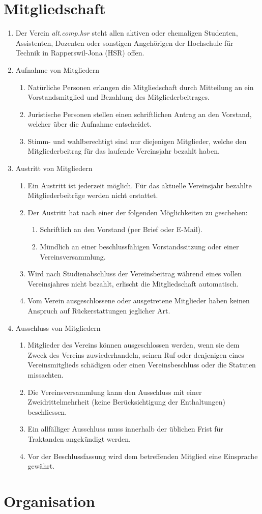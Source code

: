 \documentclass[10pt,a4paper,parskip,fleqn]{scrartcl}
\newcommand{\ol}{\begin{enumerate}[itemsep=-0.2em,topsep=-0.2em]}
\newcommand{\lo}{\end{enumerate}}
\newcommand{\li}{\item}
\begin{document}
\section{Mitgliedschaft}

\ol
  \li Der Verein \textit{alt.comp.hsr} steht allen aktiven oder ehemaligen
  Studenten, Assistenten, Dozenten oder sonstigen Angehörigen der Hochschule für
  Technik in Rapperswil-Jona (HSR) offen.
  \li Aufnahme von Mitgliedern
    \ol
      \li Natürliche Personen erlangen die Mitgliedschaft durch Mitteilung an
      ein Vorstandsmitglied und Bezahlung des Mitgliederbeitrages.
      \li Juristische Personen stellen einen schriftlichen Antrag an den
      Vorstand, welcher über die Aufnahme entscheidet.
      \li Stimm- und wahlberechtigt sind nur diejenigen Mitglieder, welche den
      Mitgliederbeitrag für das laufende Vereinsjahr bezahlt haben.
    \lo
  \li Austritt von Mitgliedern
    \ol
      \li Ein Austritt ist jederzeit möglich. Für das aktuelle Vereinsjahr
      bezahlte Mitgliederbeiträge werden nicht erstattet.
      \li Der Austritt hat nach einer der folgenden Möglichkeiten zu geschehen:
        \ol
          \li Schriftlich an den Vorstand (per Brief oder E-Mail).
          \li Mündlich an einer beschlussfähigen Vorstandssitzung oder einer
           Vereinsversammlung.
        \lo
      \li Wird nach Studienabschluss der Vereinsbeitrag während eines vollen
      Vereinsjahres nicht bezahlt, erlischt die Mitgliedschaft automatisch.
      \li Vom Verein ausgeschlossene oder ausgetretene Mitglieder haben keinen
      Anspruch auf Rückerstattungen jeglicher Art.
    \lo
  \li{Ausschluss von Mitgliedern}
    \ol
      \li Mitglieder des Vereins können ausgeschlossen werden, wenn sie dem
      Zweck des Vereins zuwiederhandeln, seinen Ruf oder denjenigen eines
      Vereinsmitglieds schädigen oder einen Vereinsbeschluss oder die Statuten
      missachten.
      \li Die Vereinsversammlung kann den Ausschluss mit einer
      Zweidrittelmehrheit (keine Berücksichtigung der Enthaltungen)
      beschliessen.
      \li Ein allfälliger Ausschluss muss innerhalb der üblichen Frist für
      Traktanden angekündigt werden.
      \li Vor der Beschlussfassung wird dem betreffenden Mitglied eine
      Einsprache gewährt.
    \lo
\lo


\section{Organisation}
\end{document}
